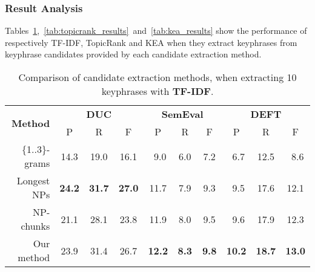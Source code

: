     \subsubsection{Result Analysis}
    \label{subsubsec:candidate_extraction_result_analysis}
      Tables~\ref{tab:tfidf_results},~\ref{tab:topicrank_results}~and~\ref{tab:kea_results}
      show the performance of respectively TF-IDF, TopicRank and KEA when
      they extract keyphrases from keyphrase candidates provided by each
      candidate extraction method.
      \begin{table}
        \centering
        \begin{tabular}{rccccccccc}
          \toprule
          \multirow{2}{*}[-2pt]{\textbf{Method}} & \multicolumn{3}{c}{\textbf{DUC}} & \multicolumn{3}{c}{\textbf{SemEval}} & \multicolumn{3}{c}{\textbf{DEFT}}\\
          \cmidrule(r){2-4}\cmidrule(lr){5-7}\cmidrule(l){8-10}
          & P & R & F & P & R & F & P & R & F\\
          \midrule
          \{1..3\}-grams & 14.3 & 19.0 & 16.1 & $~~$9.0 & $~~$6.0 & $~~$7.2 & $~~$6.7 & 12.5 & $~~$8.6\\
          Longest NPs & \textbf{24.2} & \textbf{31.7} & \textbf{27.0} & 11.7 & $~~$7.9 & $~~$9.3 & $~~$9.5 & 17.6 & 12.1\\
          NP-chunks & 21.1 & 28.1 & 23.8 & 11.9 & $~~$8.0 & $~~$9.5 & $~~$9.6 & 17.9 & 12.3\\
          Our method & 23.9 & 31.4 & 26.7 & \textbf{12.2} & \textbf{$~~$8.3} & \textbf{$~~$9.8} & \textbf{10.2} & \textbf{18.7} & \textbf{13.0}\\
          \bottomrule
        \end{tabular}
        \caption{Comparison of candidate extraction methods, when extracting 10
                 keyphrases with \textbf{TF-IDF}.
                 \label{tab:tfidf_results}}
      \end{table}
